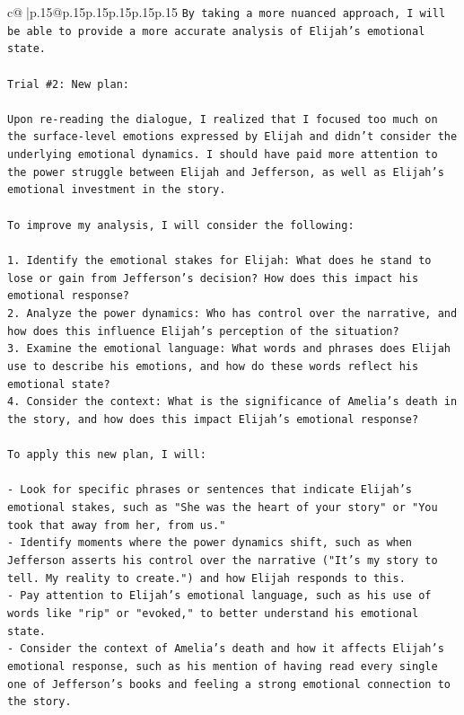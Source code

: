 \documentclass{article}
\begin{document}
{\begin{supertabular}{c@{$\;$}|p{.15\linewidth}@{}p{.15\linewidth}p{.15\linewidth}p{.15\linewidth}p{.15\linewidth}p{.15\linewidth}}
{{{\texttt{By taking a more nuanced approach, I will be able to provide a more accurate analysis of Elijah's emotional state.} \\
\\ 
\texttt{Trial \#2: New plan: } \\
\\ 
\texttt{Upon re{-}reading the dialogue, I realized that I focused too much on the surface{-}level emotions expressed by Elijah and didn't consider the underlying emotional dynamics. I should have paid more attention to the power struggle between Elijah and Jefferson, as well as Elijah's emotional investment in the story. } \\
\\ 
\texttt{To improve my analysis, I will consider the following:} \\
\\ 
\texttt{1. Identify the emotional stakes for Elijah: What does he stand to lose or gain from Jefferson's decision? How does this impact his emotional response?} \\
\texttt{2. Analyze the power dynamics: Who has control over the narrative, and how does this influence Elijah's perception of the situation?} \\
\texttt{3. Examine the emotional language: What words and phrases does Elijah use to describe his emotions, and how do these words reflect his emotional state?} \\
\texttt{4. Consider the context: What is the significance of Amelia's death in the story, and how does this impact Elijah's emotional response?} \\
\\ 
\texttt{To apply this new plan, I will:} \\
\\ 
\texttt{{-} Look for specific phrases or sentences that indicate Elijah's emotional stakes, such as "She was the heart of your story" or "You took that away from her, from us."} \\
\texttt{{-} Identify moments where the power dynamics shift, such as when Jefferson asserts his control over the narrative ("It's my story to tell. My reality to create.") and how Elijah responds to this.} \\
\texttt{{-} Pay attention to Elijah's emotional language, such as his use of words like "rip" or "evoked," to better understand his emotional state.} \\
\texttt{{-} Consider the context of Amelia's death and how it affects Elijah's emotional response, such as his mention of having read every single one of Jefferson's books and feeling a strong emotional connection to the story.} \\
}}}
\end{supertabular}}
\end{document}

